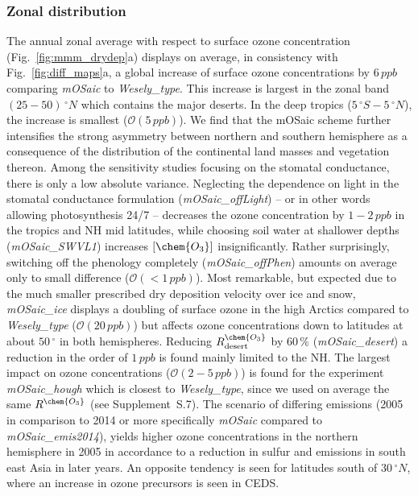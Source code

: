 \documentclass[gmd, manuscript]{copernicus}
\begin{document}
\subsubsection{Zonal distribution}
\label{subsubsec:zonal}
%
The annual zonal average with respect to surface ozone concentration (Fig.~\ref{fig:mmm_drydep}a) displays on average, in consistency with Fig.~\ref{fig:diff_maps}a, a global increase of surface ozone concentrations by $6\,\unit{ppb}$ comparing \emph{mOSaic} to \emph{Wesely\_type}. This increase is largest in the zonal band $(25-50)\,\unit{^\circ N}$ which contains the major deserts. In the deep tropics ($5\,\unit{^\circ S}-5\,\unit{^\circ N}$), the increase is smallest ($\mathcal{O}(5\,\unit{ppb})$). We find that the mOSaic scheme further intensifies the strong asymmetry between northern and southern hemisphere as a consequence of the distribution of the continental land masses and vegetation thereon. Among the sensitivity studies focusing on the stomatal conductance, there is only a low absolute variance. Neglecting the dependence on light in the stomatal conductance formulation (\emph{mOSaic\_offLight}) -- or in other words allowing photosynthesis 24/7 -- decreases the ozone concentration by $1-2\,\unit{ppb}$ in the tropics and NH mid latitudes, while choosing soil water at shallower depths (\emph{mOSaic\_SWVL1}) increases $[\chem{O_3}]$ insignificantly. Rather surprisingly, switching off the phenology completely (\emph{mOSaic\_offPhen}) amounts on average only to small difference ($\mathcal{O}(<1\,\unit{ppb})$). Most remarkable, but expected due to the much smaller prescribed dry deposition velocity over ice and snow, \emph{mOSaic\_ice} displays a doubling of surface ozone in the high Arctics compared to \emph{Wesely\_type} ($\mathcal{O}(20\,\unit{ppb})$) but affects ozone concentrations down to latitudes at about $50\,\unit{^\circ}$ in both hemispheres. Reducing $R^\chem{O_3}_\text{desert}$ by $60\,\unit{\%}$ (\emph{mOSaic\_desert}) a reduction in the order of $1\,\unit{ppb}$ is found mainly limited to the NH. The largest impact on ozone concentrations ($\mathcal{O}(2-5\,\unit{ppb})$) is found for the experiment \emph{mOSaic\_hough} which is closest to \emph{Wesely\_type}, since we used on average the same $R^\chem{O_3}$ (see Supplement~S.7). The scenario of differing emissions (2005 in comparison to 2014 or more specifically \emph{mOSaic} compared to \emph{mOSaic\_emis2014}), yields higher ozone concentrations in the northern hemisphere in 2005 in accordance to a reduction in sulfur and  emissions in south east Asia in later years. An opposite tendency is seen for latitudes south of $30\,\unit{^\circ N}$, where an increase in ozone precursors is seen in CEDS. 
\end{document}
